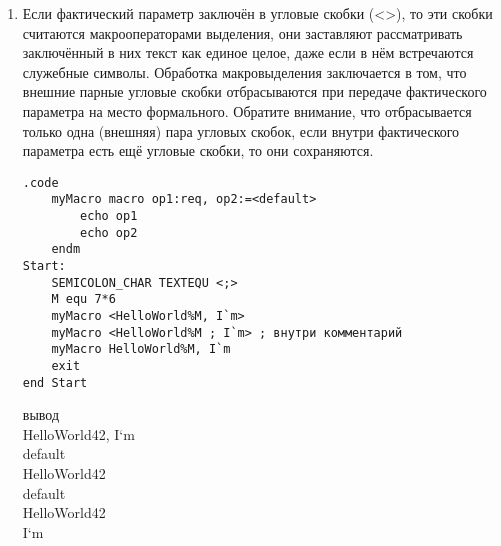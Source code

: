 \documentclass[a4paper,10pt]{article}
\begin{document}
\begin{enumerate}
\begin{multicols}{2}
HelloWorld!\%M \\
Helloworld! \\
Helloworld \\
test.asm(17) : error A2038: missing operand for macro operator \\
 myMacro(1): Macro Called From \\
  test.asm(17): Main Line Code \\
Helloworld! \\
\end{multicols}
отметим что \% и ! поставленные в конце выражения выдадут ошибку, необходимо экранировать
\item Если фактический параметр заключён в угловые скобки (<>), то эти скобки считаются макрооператорами выделения, они заставляют рассматривать заключённый в них текст как единое целое, даже если в нём встречаются служебные символы. Обработка макровыделения заключается в том, что внешние парные угловые скобки отбрасываются при передаче фактического параметра на место формального. Обратите внимание, что отбрасывается только
одна (внешняя) пара угловых скобок, если внутри фактического параметра есть ещё угловые
скобки, то они сохраняются.
\begin{multicols}{2}
\begin{verbatim}
.code
    myMacro macro op1:req, op2:=<default>
        echo op1
        echo op2
    endm
Start:
    SEMICOLON_CHAR TEXTEQU <;>
    M equ 7*6
    myMacro <HelloWorld%M, I`m>
    myMacro <HelloWorld%M ; I`m> ; внутри комментарий
    myMacro HelloWorld%M, I`m
    exit
end Start
\end{verbatim}
    \columnbreak
вывод \\
HelloWorld42, I`m \\
default \\
HelloWorld42 \\
default \\
HelloWorld42 \\
I`m \\
\end{multicols}


\end{enumerate}
\end{document}
